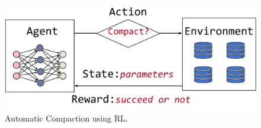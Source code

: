 



\begin{figure}[htbp]
	\includegraphics[scale=0.38]{figures/rl}
	\centering
	\vspace{-1em}
	\caption{Automatic Compaction using RL.}
	\label{fig:rl}
	\vspace{-1em}
\end{figure}


